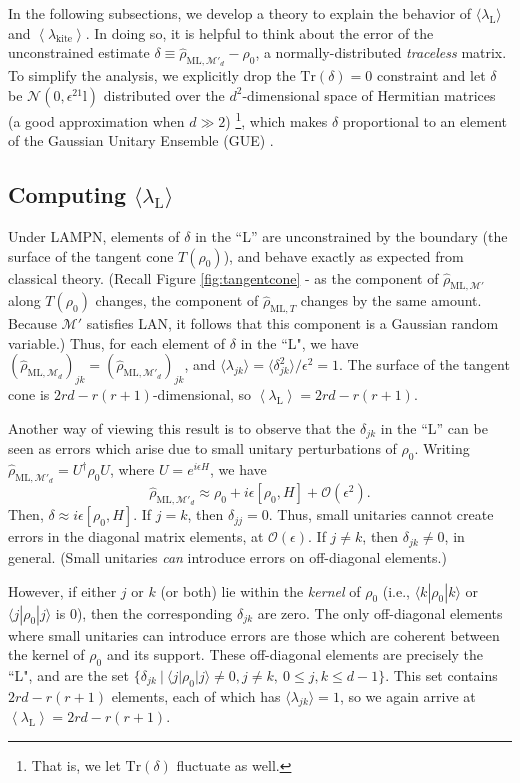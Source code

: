 \documentclass[aps,pra, twocolumn]{revtex4-1}
\newcommand{\M}{\mathcal{M}}
\newcommand{\Tr}{\mathrm{Tr}}
\newcommand{\Id}{\mathbb{I}}
\newcommand{\expect}[1]{\ensuremath{\left\langle#1\right\rangle}}
\def\Id{1\!\mathrm{l}}
\newcommand{\rhohat}{\hat{\rho}}
\newcommand{\rhoML}[1]{\rhohat_{\scriptscriptstyle{\mathrm{ML},#1}}}
\begin{document}
In the following subsections, we develop a theory to explain the behavior of $\langle \lambda_{\mathrm{L}}\rangle$ and \expect{\lambda_{\mathrm{kite}}}.
In doing so, it is helpful to think about the error of the unconstrained estimate $\delta \equiv \rhoML{\M'_{d}}- \rho_{0}$, a normally-distributed \emph{traceless} matrix.  To simplify the analysis, we explicitly drop the $\Tr(\delta)=0$ constraint and let $\delta$ be $\mathcal{N}(0,\epsilon^2\Id)$ distributed over the $d^2$-dimensional space of Hermitian matrices (a good approximation when $d\gg2$) \footnote{That is, we let $\mathrm{Tr}(\delta)$ fluctuate as well.}, which makes $\delta$ proportional to an element of the Gaussian Unitary Ensemble (GUE) \cite{Fyodorov2005}.

\subsection{Computing $\langle \lambda_\mathrm{L}\rangle$}
\label{subsec:L}
Under LAMPN, elements of $\delta$ in the ``L'' are unconstrained by the boundary (the surface of the tangent cone $T(\rho_{0})$), and behave exactly as expected from classical theory. (Recall Figure \ref{fig:tangentcone} - as the component of $\rhoML{\M'}$ along $T(\rho_{0})$ changes, the component of $\rhoML{T}$ changes by the same amount. Because $\M'$ satisfies LAN, it follows that this component is a Gaussian random variable.) Thus, for each element of $\delta$ in the ``L", we have $(\rhoML{\M_{d}})_{jk} = (\rhoML{\M'_{d}})_{jk}$, and $\langle \lambda_{jk} \rangle = \langle \delta_{jk}^{2}\rangle /\epsilon^{2} = 1$. The surface of the tangent cone is $2rd - r(r+1)$-dimensional, so $\expect{\lambda_{\mathrm{L}}} = 2rd - r(r+1)$.

Another way of viewing this result is to observe that the $\delta_{jk}$ in the ``L'' can be seen as errors which arise due to small unitary perturbations of $\rho_{0}$. Writing $\rhoML{\M'_{d}} = U^{\dagger}\rho_{0}U$, where $U=e^{i\epsilon H}$, we have
\[\rhoML{\M'_{d}} \approx \rho_{0} + i\epsilon [\rho_{0},H]+\mathcal{O}(\epsilon^{2}).\]
Then, $\delta \approx i\epsilon [\rho_{0},H]$.
If $j = k$, then $\delta_{jj} = 0$. Thus, small unitaries cannot create errors in the diagonal matrix elements, at $\mathcal{O}(\epsilon)$. If $j \neq k$, then $\delta_{jk} \neq 0$, in general. (Small unitaries \emph{can} introduce errors on off-diagonal elements.)

However, if either $j$ or $k$ (or both) lie within the \emph{kernel} of $\rho_{0}$ (i.e., $\langle k | \rho_{0}| k \rangle$ or $\langle j|\rho_{0}|j\rangle$ is 0), then the corresponding $\delta_{jk}$ are zero. The only off-diagonal elements where small unitaries can introduce errors are those which are coherent between the kernel of $\rho_{0}$ and its support. These off-diagonal elements are precisely the ``L", and are  the set $\{\delta_{jk}~|~\langle j | \rho_{0}|j\rangle \neq 0, j\neq k, ~ 0 \leq j,k \leq d - 1\}$. This set contains $2rd - r(r+1)$ elements, each of which has $\langle \lambda_{jk}\rangle = 1$, so we again arrive at $\expect{\lambda_{\mathrm{L}}} = 2rd - r(r+1)$.
\end{document}
